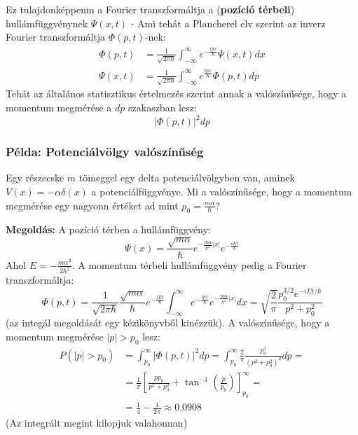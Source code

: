 \documentclass[../main.tex]{subfiles}
\begin{document}
Ez tulajdonképpenm a Fourier transzformáltja a (\textbf{pozíció térbeli}) hullámfüggvénynek $\Psi(x,t)$ - Ami tehát a Plancherel elv szerint az inverz Fourier transzformáltja $\Phi(p,t)$-nek:
\begin{equation}
    \begin{aligned}
    \Phi(p,t) &= \frac{1}{\sqrt{2 \pi \hbar}} \int_{-\infty}^{\infty} e^{-\frac{i p x}{\hbar}} \Psi(x,t) dx \\
    \Psi(x,t) &= \frac{1}{\sqrt{2 \pi \hbar}} \int_{-\infty}^{\infty} e^{\frac{i p x}{\hbar}} \Phi(p,t) dp
    \end{aligned}
\end{equation}
Tehát az általános statisztikus értelmezés szerint annak a valószínűsége, hogy a momentum megmérése a $dp$ szakaszban lesz:
\begin{equation}
    |\Phi(p,t)|^2 dp
\end{equation}

\subsubsection*{Példa: Potenciálvölgy valószínűség}
Egy részecske $m$ tömeggel egy delta potenciálvölgyben van, aminek $V(x) = -\alpha \delta(x)$ a potenciálfüggvénye. Mi a valószínűsége, hogy a momentum megmérése egy nagyonn értéket ad mint $p_0 = \frac{m \alpha}{\hbar}$?

\textbf{Megoldás:} A pozíció térben a hullámfüggvény:
\begin{equation}
    \Psi(x) = \frac{\sqrt{m\alpha}}{\hbar} e^{-\frac{m \alpha}{\hbar^2} |x|} e^{-\frac{i E t}{\hbar}}
\end{equation}
Ahol $E = -\frac{m \alpha^2}{2 \hbar^2}$. A momentum térbeli hullámfüggvény pedig a Fourier transzformáltja:
\begin{equation}
   \Phi(p, t) = \frac{1}{\sqrt{2 \pi \hbar}} \frac{\sqrt{m \alpha}}{\hbar} e^{-\frac{i E t}{\hbar}} \int_{-\infty}^{\infty} e^{-\frac{i p x}{\hbar}} e^{-\frac{m \alpha}{\hbar^2} |x|} dx = \sqrt{\frac{2}{\pi}} \frac{p^{3/2}_0 e^{-iEt/\hbar}}{p^2 + p^2_0}
\end{equation}
(az integál megoldását egy kézikönyvből kinézzük). A valószínűsége, hogy a momentum megmérése $|p| > p_0$ lesz:
\begin{equation}
    \begin{aligned}
    P(|p| > p_0) &= \int_{p_0}^{\infty} |\Phi(p,t)|^2 dp = \int_{p_0}^{\infty} \frac{2}{\pi} \frac{p^3_0}{(p^2 + p^2_0)^2} dp = \\
    &= \frac{1}{\pi} \left[ \frac{p p_0}{p^2 + p_0^2} + \tan^{-1}\left(\frac{p}{p_0}\right) \right]_{p_0}^{\infty} = \\
    &= \frac{1}{4} - \frac{1}{2\pi} \approx 0.0908
    \end{aligned}
\end{equation}
(Az integrált megint kilopjuk valahonnan)
\end{document}
